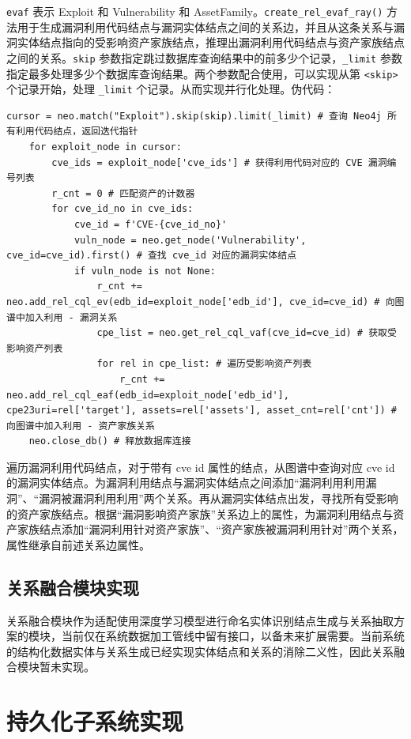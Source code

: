 \documentclass[a4paper,AutoFakeBold,oneside,12pt]{book}
\begin{document}
\lstinline|evaf| 表示 Exploit 和 Vulnerability 和 AssetFamily。\lstinline|create_rel_evaf_ray()| 方法用于生成漏洞利用代码结点与漏洞实体结点之间的关系边，并且从这条关系与漏洞实体结点指向的受影响资产家族结点，推理出漏洞利用代码结点与资产家族结点之间的关系。\lstinline|skip| 参数指定跳过数据库查询结果中的前多少个记录，\lstinline|_limit| 参数指定最多处理多少个数据库查询结果。两个参数配合使用，可以实现从第 \lstinline|<skip>| 个记录开始，处理 \lstinline|_limit| 个记录。从而实现并行化处理。伪代码：
\begin{lstlisting}[style=lgeneral]
	cursor = neo.match("Exploit").skip(skip).limit(_limit) # 查询 Neo4j 所有利用代码结点，返回迭代指针
	for exploit_node in cursor:
		cve_ids = exploit_node['cve_ids'] # 获得利用代码对应的 CVE 漏洞编号列表
		r_cnt = 0 # 匹配资产的计数器
		for cve_id_no in cve_ids:
			cve_id = f'CVE-{cve_id_no}'
			vuln_node = neo.get_node('Vulnerability', cve_id=cve_id).first() # 查找 cve_id 对应的漏洞实体结点
			if vuln_node is not None:
				r_cnt += neo.add_rel_cql_ev(edb_id=exploit_node['edb_id'], cve_id=cve_id) # 向图谱中加入利用 - 漏洞关系
				cpe_list = neo.get_rel_cql_vaf(cve_id=cve_id) # 获取受影响资产列表
				for rel in cpe_list: # 遍历受影响资产列表
					r_cnt += neo.add_rel_cql_eaf(edb_id=exploit_node['edb_id'], cpe23uri=rel['target'], assets=rel['assets'], asset_cnt=rel['cnt']) # 向图谱中加入利用 - 资产家族关系
	neo.close_db() # 释放数据库连接
\end{lstlisting}

遍历漏洞利用代码结点，对于带有 cve id 属性的结点，从图谱中查询对应 cve id 的漏洞实体结点。为漏洞利用结点与漏洞实体结点之间添加``漏洞利用利用漏洞''、``漏洞被漏洞利用利用''两个关系。再从漏洞实体结点出发，寻找所有受影响的资产家族结点。根据``漏洞影响资产家族''关系边上的属性，为漏洞利用结点与资产家族结点添加``漏洞利用针对资产家族''、``资产家族被漏洞利用针对''两个关系，属性继承自前述关系边属性。

\subsection{关系融合模块实现}

关系融合模块作为适配使用深度学习模型进行命名实体识别结点生成与关系抽取方案的模块，当前仅在系统数据加工管线中留有接口，以备未来扩展需要。当前系统的结构化数据实体与关系生成已经实现实体结点和关系的消除二义性，因此关系融合模块暂未实现。

\section{持久化子系统实现}
\end{document}
